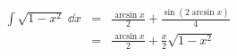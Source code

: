 \begin{frame}[fragile]
\begin{minipage}{0.33\textwidth}
    
    \end{minipage}
    
    
    \bigskip 
    \pause
             
    \begin{minipage}{0.59\textwidth}
    $\begin{array}{rcl}
    \int \sqrt{1-x^2} \; \dd x &=& \frac{\arcsin x}{2} + \frac{\sin(2\arcsin x)}{4}\\
    
    
    &=& \frac{\arcsin x}{2} + \frac x2 \sqrt{1-x^2}\end{array}$
    \end{minipage} 
    \begin{minipage}{0.33\textwidth}
    \end{minipage}
    
   


\end{frame}

